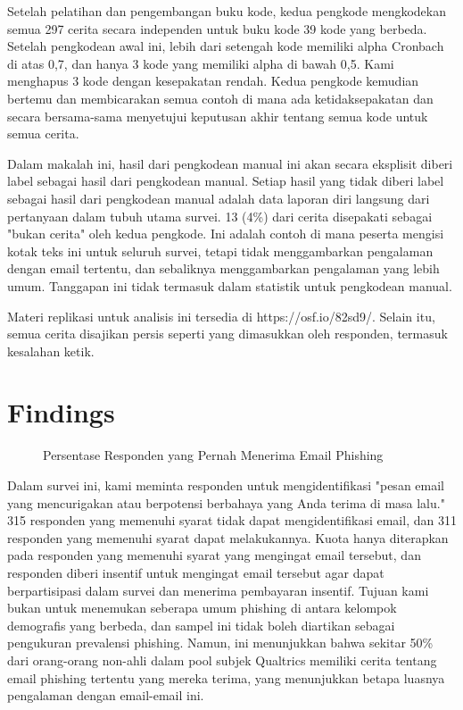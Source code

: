 \documentclass[lettersize,journal]{IEEEtran}
\begin{document}
Setelah pelatihan dan pengembangan buku kode, kedua pengkode mengkodekan semua
297 cerita secara independen untuk buku kode 39 kode yang berbeda. Setelah
pengkodean awal ini, lebih dari setengah kode memiliki alpha Cronbach di atas
0,7, dan hanya 3 kode yang memiliki alpha di bawah 0,5. Kami menghapus 3 kode
dengan kesepakatan rendah. Kedua pengkode kemudian bertemu dan membicarakan
semua contoh di mana ada ketidaksepakatan dan secara bersama-sama menyetujui
keputusan akhir tentang semua kode untuk semua cerita.

Dalam makalah ini, hasil dari pengkodean manual ini akan secara eksplisit
diberi label sebagai hasil dari pengkodean manual. Setiap hasil yang tidak
diberi label sebagai hasil dari pengkodean manual adalah data laporan diri
langsung dari pertanyaan dalam tubuh utama survei. 13 (4\%) dari cerita
disepakati sebagai "bukan cerita" oleh kedua pengkode. Ini adalah contoh di
mana peserta mengisi kotak teks ini untuk seluruh survei, tetapi tidak
menggambarkan pengalaman dengan email tertentu, dan sebaliknya menggambarkan
pengalaman yang lebih umum. Tanggapan ini tidak termasuk dalam statistik untuk
pengkodean manual.

Materi replikasi untuk analisis ini tersedia di https://osf.io/82sd9/. Selain
itu, semua cerita disajikan persis seperti yang dimasukkan oleh responden,
termasuk kesalahan ketik.

\section{Findings}

\begin{figure}[h]
  \centering
  \caption{Persentase Responden yang Pernah Menerima Email Phishing}
  \label{fig:phishing_experience}
\end{figure}

Dalam survei ini, kami meminta responden untuk mengidentifikasi "pesan email
yang mencurigakan atau berpotensi berbahaya yang Anda terima di masa lalu." 315
responden yang memenuhi syarat tidak dapat mengidentifikasi email, dan 311
responden yang memenuhi syarat dapat melakukannya. Kuota hanya diterapkan pada
responden yang memenuhi syarat yang mengingat email tersebut, dan responden
diberi insentif untuk mengingat email tersebut agar dapat berpartisipasi dalam
survei dan menerima pembayaran insentif. Tujuan kami bukan untuk menemukan
seberapa umum phishing di antara kelompok demografis yang berbeda, dan sampel
ini tidak boleh diartikan sebagai pengukuran prevalensi phishing. Namun, ini
menunjukkan bahwa sekitar 50\% dari orang-orang non-ahli dalam pool subjek
Qualtrics memiliki cerita tentang email phishing tertentu yang mereka terima,
yang menunjukkan betapa luasnya pengalaman dengan email-email ini.
\end{document}
